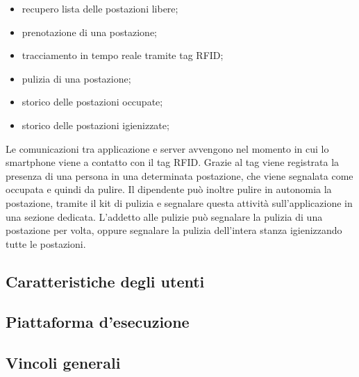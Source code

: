 \begin{itemize}
	\item recupero lista delle postazioni libere; \\
	\item prenotazione di una postazione; \\
	\item tracciamento in tempo reale tramite tag RFID; \\
	\item pulizia di una postazione; \\
	\item storico delle postazioni occupate; \\
	\item storico delle postazioni igienizzate; \\ 
\end{itemize}
Le comunicazioni tra applicazione e server avvengono nel momento in cui lo smartphone viene a contatto con il tag RFID. Grazie al tag viene registrata la presenza di una persona in una determinata postazione, che viene segnalata come occupata e quindi da pulire. Il dipendente può inoltre pulire in autonomia la postazione, tramite il kit di pulizia e segnalare questa attività sull’applicazione in una sezione dedicata.
L’addetto alle pulizie può segnalare la pulizia di una postazione per volta, oppure segnalare la pulizia dell’intera stanza igienizzando tutte le postazioni.

\subsection{Caratteristiche degli utenti}

\subsection{Piattaforma d'esecuzione}

\subsection{Vincoli generali}
